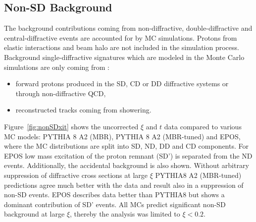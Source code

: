 \subsection{Non-SD Background}\label{section:star_nonSD}
The background contributions coming from non-diffractive, double-diffractive and central-diffractive events are accounted for by MC simulations. Protons from elastic interactions and beam halo are not included in the simulation process. Background single-diffractive  signatures which are modeled in the Monte Carlo simulations are only coming from :
\begin{itemize}
	\item forward protons produced in the SD, CD or DD diffractive systems or through non-diffractive  QCD,
	\item reconstructed tracks coming from showering.
\end{itemize}
Figure~\ref{fig:nonSDxit} shows the uncorrected $\xi$ and $t$ data compared to various MC models: PYTHIA 8 A2 (MBR), PYTHIA 8 A2 (MBR-tuned) and EPOS, where the MC distributions are split into SD, ND, DD and CD components. For EPOS low mass excitation of the proton remnant (SD') is separated from the ND events. Additionally, the accidental background is also shown. Without arbitrary suppression of diffractive cross sections at large $\xi$ PYTHIA8 A2 (MBR-tuned) predictions agree much better with the data and result also in a suppression of non-SD events. EPOS describes data better than PYTHIA8 but shows a dominant contribution of SD' events. All MCs predict significant non-SD background at large $\xi$, thereby  the analysis was limited to $\xi < 0.2$. 


